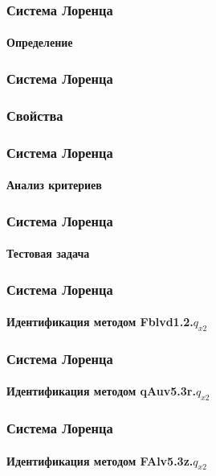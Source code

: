 \documentclass[10pt,utf8]{beamer}
\begin{document}
\begin{frame}
  \frametitle{Система Лоренца}
  \framesubtitle{Определение}


\end{frame}




\begin{frame}
  \frametitle{Система Лоренца}
  \frametitle{Свойства}


\end{frame}




\begin{frame}
  \frametitle{Система Лоренца}
  \framesubtitle{Анализ критериев}


\end{frame}




\begin{frame}
  \frametitle{Система Лоренца}
  \framesubtitle{Тестовая задача}


\end{frame}




\begin{frame}
  \frametitle{Система Лоренца}
  \framesubtitle{Идентификация методом  Fblvd1.2.$q_{x2}$ }


\end{frame}




\begin{frame}
  \frametitle{Система Лоренца}
  \framesubtitle{Идентификация методом qAuv5.3r.$q_{x2}$}


\end{frame}




\begin{frame}
  \frametitle{Система Лоренца}
  \framesubtitle{Идентификация методом FAlv5.3z.$q_{x2}$}


\end{frame}
\end{document}
